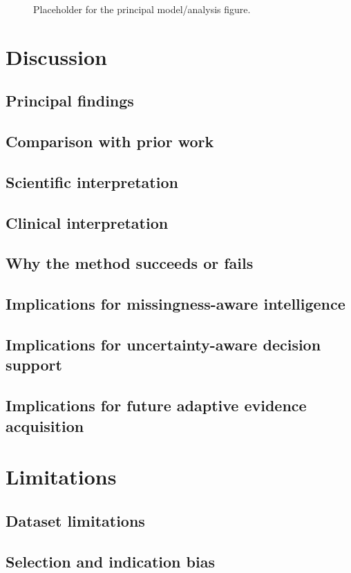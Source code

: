 \documentclass[10pt,journal]{IEEEtran}
\begin{document}
\begin{figure}[t]
    \centering
    \fbox{\rule{0pt}{1.7in}\rule{0.95\columnwidth}{0pt}}
    \caption{Placeholder for the principal model/analysis figure.}
    \label{fig:main}
\end{figure}

\section{Discussion}
\subsection{Principal findings}
\subsection{Comparison with prior work}
\subsection{Scientific interpretation}
\subsection{Clinical interpretation}
\subsection{Why the method succeeds or fails}
\subsection{Implications for missingness-aware intelligence}
\subsection{Implications for uncertainty-aware decision support}
\subsection{Implications for future adaptive evidence acquisition}

\section{Limitations}
\subsection{Dataset limitations}
\subsection{Selection and indication bias}
\end{document}
